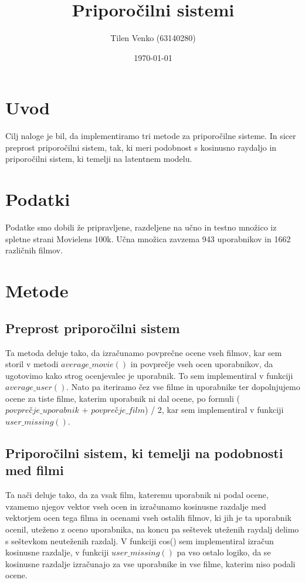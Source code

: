 \documentclass[a4paper,11pt]{article}
\title{Priporočilni sistemi}
\author{Tilen Venko (63140280)}
\date{\today}
\begin{document}
\maketitle

\section{Uvod}

Cilj naloge je bil, da implementiramo tri metode za priporočilne sisteme. In sicer preprost priporočilni sistem, tak, ki meri podobnost s kosinusno raydaljo in priporočilni sistem, ki temelji na latentnem modelu.

\section{Podatki}

Podatke smo dobili že pripravljene, razdeljene na učno in testno množico iz spletne strani Movielens 100k. Učna množica zavzema 943 uporabnikov in 1662 različnih filmov.

\section{Metode}

\subsection{Preprost priporočilni sistem}

Ta metoda deluje tako, da izračunamo povprečne ocene vseh filmov, kar sem storil v metodi $average\_movie()$ in povprečje vseh ocen uporabnikov, da ugotovimo kako strog ocenjevalec je uporabnik. To sem implementiral v funkciji $average\_user()$. Nato pa iteriramo čez vse filme in uporabnike ter dopolnjujemo ocene za tiste filme, katerim uporabnik ni dal ocene, po formuli ($povprečje\_uporabnik$ + $povprečje\_film$) / 2, kar sem implementiral v funkciji $user\_missing()$.

\subsection{Priporočilni sistem, ki temelji na podobnosti med filmi}

Ta nači deluje tako, da za vsak film, kateremu uporabnik ni podal ocene, vzamemo njegov vektor vseh ocen in izračunamo kosinusne razdalje med vektorjem ocen tega filma in ocenami vseh ostalih filmov, ki jih je ta uporabnik ocenil, uteženo z oceno uporabnika, na koncu pa seštevek uteženih raydalj delimo s seštevkom neuteženih razdalj. V funkciji cos() sem implementiral izračun kosinusne razdalje, v funkciji $user\_missing()$ pa vso ostalo logiko, da se kosinusne razdalje izračunajo za vse uporabnike in vse filme, katerim niso podali ocene. 
\end{document}
